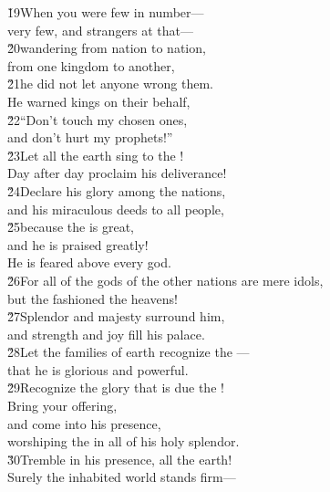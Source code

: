 \begin{poetry}
\poeml \v{19}When you were few in number--- \\
\poemll    very few, and strangers at that--- \\
\poeml \v{20}wandering from nation to nation, \\
\poemll    from one kingdom to another, \\
\poeml \v{21}he did not let anyone wrong them. \\
\poemll    He warned kings on their behalf, \\
\poeml \v{22}``Don't touch my chosen ones, \\
\poemll    and don't hurt my prophets!'' \\
\poeml \v{23}Let all the earth sing to the ! \\
\poemll    Day after day proclaim his deliverance! \\
\poeml \v{24}Declare his glory among the nations, \\
\poemll    and his miraculous deeds to all people, \\
\poeml \v{25}because the  is great, \\
\poemll    and he is praised greatly! \\
\poemlll       He is feared above every god. \\
\poeml \v{26}For all of the gods of the other nations are mere idols, \\
\poemll    but the  fashioned the heavens! \\
\poeml \v{27}Splendor and majesty surround him, \\
\poemll    and strength and joy fill his palace. \\
\poeml \v{28}Let the families of earth recognize the --- \\
\poemll    that he is glorious and powerful. \\
\poeml \v{29}Recognize the glory that is due the ! \\
\poemll    Bring your offering, \\
\poeml and come into his presence, \\
\poemll    worshiping the  in all of his holy splendor. \\
\poeml \v{30}Tremble in his presence, all the earth! \\
\poemll    Surely the inhabited world stands firm--- \\

\end{poetry}
